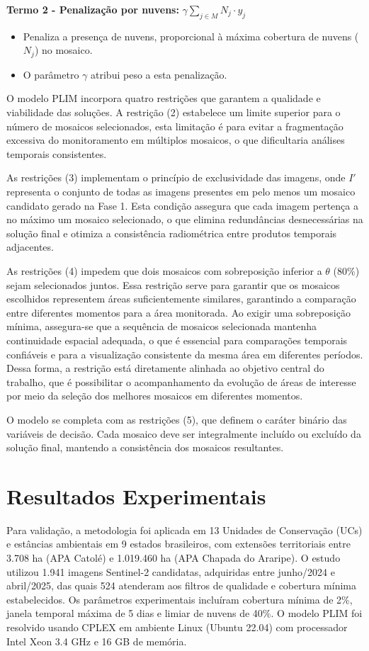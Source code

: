 \documentclass[a4paper,11pt]{article}
\begin{document}
\textbf{Termo 2 - Penalização por nuvens:} $\gamma \sum_{j \in M} N_j \cdot y_j$
\begin{itemize}[noitemsep, topsep=0pt]
    \item Penaliza a presença de nuvens, proporcional à máxima cobertura de nuvens ($N_j$) no mosaico.
    \item O parâmetro $\gamma$ atribui peso a esta penalização.
\end{itemize}

O modelo PLIM incorpora quatro restrições que garantem a qualidade e viabilidade das soluções. A restrição (2) estabelece um limite superior para o número de mosaicos selecionados, esta limitação é para evitar a fragmentação excessiva do monitoramento em múltiplos mosaicos, o que dificultaria análises temporais consistentes.

As restrições (3) implementam o princípio de exclusividade das imagens, onde $I'$ representa o conjunto de todas as imagens presentes em pelo menos um mosaico candidato gerado na Fase 1. Esta condição assegura que cada imagem pertença a no máximo um mosaico selecionado, o que elimina redundâncias desnecessárias na solução final e otimiza a consistência radiométrica entre produtos temporais adjacentes.

As restrições (4) impedem que dois mosaicos com sobreposição inferior a $\theta$ (80\%) sejam selecionados juntos. Essa restrição serve para garantir que os mosaicos escolhidos representem áreas suficientemente similares, garantindo a comparação entre diferentes momentos para a área monitorada. Ao exigir uma sobreposição mínima, assegura-se que a sequência de mosaicos selecionada mantenha continuidade espacial adequada, o que é essencial para comparações temporais confiáveis e para a visualização consistente da mesma área em diferentes períodos. Dessa forma, a restrição está diretamente alinhada ao objetivo central do trabalho, que é possibilitar o acompanhamento da evolução de áreas de interesse por meio da seleção dos melhores mosaicos em diferentes momentos.

O modelo se completa com as restrições (5), que definem o caráter binário das variáveis de decisão. Cada mosaico deve ser integralmente incluído ou excluído da solução final, mantendo a consistência dos mosaicos resultantes.
\vspace{-7mm}

\section{Resultados Experimentais}
\vspace{-4mm}
Para validação, a metodologia foi aplicada em 13 Unidades de Conservação (UCs) e estâncias
ambientais em 9 estados brasileiros, com extensões territoriais entre 3.708 ha (APA Catolé) e
1.019.460 ha (APA Chapada do Araripe). O estudo utilizou 1.941 imagens Sentinel-2 candidatas, adquiridas entre junho/2024 e abril/2025, das quais 524 atenderam aos filtros de qualidade e cobertura mínima estabelecidos. 
Os parâmetros experimentais incluíram cobertura mínima de 2\%, janela temporal máxima de 5 dias e limiar de
nuvens de 40\%. O modelo PLIM foi resolvido usando CPLEX em ambiente Linux (Ubuntu 22.04) com processador Intel Xeon 3.4 GHz e 16 GB de memória. 
\end{document}
